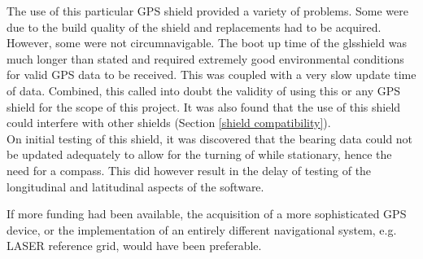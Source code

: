    The use of this particular \gls{GPS} shield provided a variety of problems. Some were due to the build quality of the shield and replacements had to be acquired. However, some were not circumnavigable. The boot up time of the gls{shield} was much longer than stated and required extremely good environmental conditions for valid \gls{GPS} data to be received. This was coupled with a very slow update time of data. Combined, this called into doubt the validity of using this or any \gls{GPS} \gls{shield} for the scope of this project. It was also found that the use of this \gls{shield} could interfere with other \glspl{shield} (Section \ref{shield compatibility}).\\
    On initial testing of this \gls{shield}, it was discovered that the bearing data could not be updated adequately to allow for the turning of \SandE while stationary, hence the need for a compass. This did however result in the delay of testing of the longitudinal and latitudinal aspects of the software.

    If more funding had been available, the acquisition of a more sophisticated \gls{GPS} device, or the implementation of an entirely different navigational system, e.g. LASER reference grid, would have been preferable.
